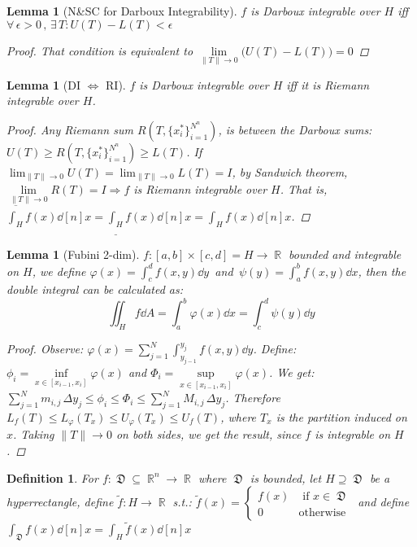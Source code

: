 \documentclass[12pt]{article}
\let\RA\Rightarrow
\let\LR\Leftrightarrow
\newcommand{\Forall}[1]{\forall\,{#1}\,,\,}
\newcommand{\Exist}[1]{\exists\,{#1}:}
\DeclareMathOperator{\R}{\mathbb{R}}
\DeclareMathOperator{\D}{\mathfrak{D}}
\newtheorem{definition}[theorem]{Definition}
\newtheorem{lemma}[theorem]{Lemma}
\begin{document}
\begin{lemma}[N\&SC for Darboux Integrability]
  $f$ is Darboux integrable over $H$ iff $\Forall{\epsilon>0}\Exist{T}U(T)-L(T)<\epsilon$
  \begin{proof}
    That condition is equivalent to $\lim\limits_{\|T\|\to 0}\big(U(T)-L(T)\big)=0$
  \end{proof}
\end{lemma}

\begin{lemma}[DI $\LR$ RI]
  \label{darboux_cond}
  $f$ is Darboux integrable over $H$ iff it is Riemann integrable over $H$.
  \begin{proof}
    Any Riemann sum $R(T,\{x_i^*\}_{i=1}^{N^n})$, is between the Darboux sums: $U(T)\geq R(T,\{x_i^*\}_{i=1}^{N^n})\geq L(T)$. If $\displaystyle\lim_{\|T\|\to 0}U(T)=\lim_{\|T\|\to 0}L(T)=I$, by Sandwich theorem, $\lim\limits_{\|T\|\to 0}R(T)=I\RA f$ is Riemann integrable over $H$. That is, $\displaystyle \overline{\int_H} f(x)\dd[n]{x}=\underline{\int_H} f(x)\dd[n]{x}=\int_H f(x)\dd[n]{x}$.
  \end{proof}
\end{lemma}

\begin{lemma}[Fubini 2-dim]
  \label{fubini_rect}
  $f:[a,b]\times[c,d]=H\to\R$ bounded and integrable on $H$, we define $\displaystyle\varphi(x)=\int_c^d f(x,y)\dd{y}\,$ and $\displaystyle\,\psi(y)=\int_a^b f(x,y)\dd{x}$, then the double integral can be calculated as:
  $$\iint_H f\dd{A}=\int_a^b \varphi(x)\dd{x}=\int_c^d\psi(y)\dd{y}$$
  \begin{proof}
    Observe: $\displaystyle\varphi(x)=\sum_{j=1}^N \int_{y_{j-1}}^{y_j}f(x,y)\dd{y}$. Define: $\phi_i=\inf\limits_{x\in[x_{i-1},x_i]}\varphi(x)$ and $\Phi_i=\sup\limits_{x\in[x_{i-1},x_i]}\varphi(x)$. We get: $\displaystyle\sum_{j=1}^N m_{i,j}\,\Delta y_j\leq \phi_i\leq\Phi_i\leq\sum_{j=1}^N M_{i,j}\,\Delta y_j$. Therefore $L_f(T)\leq L_\varphi(T_x)\leq U_\varphi(T_x)\leq U_f(T)$, where $T_x$ is the partition induced on $x$. Taking $\|T\|\to 0$ on both sides, we get the result, since $f$ is integrable on $H$.
  \end{proof}
\end{lemma}

\begin{definition}
  \label{def_domain_integration}
  For $f:\D\subseteq\R^n\to\R$ where $\D$ is bounded, let $H\supseteq\D$ be a hyperrectangle, define $\tilde{f}:H\to\R$ s.t.: $\tilde{f}(x)=\begin{cases}f(x)&\text{ if }x\in\D\\0&\text{otherwise}\end{cases}$ and define $\displaystyle \int_{\D} f(x)\dd[n]{x}=\int_H \tilde{f}(x)\dd[n]{x}$
\end{definition}
\end{document}
